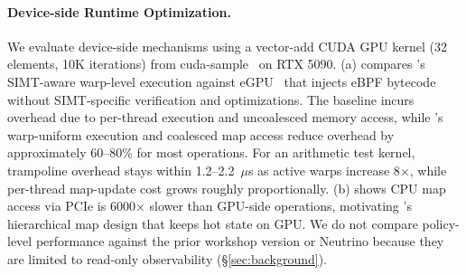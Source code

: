 \paragraph{Device-side Runtime Optimization.}
We evaluate device-side \sys mechanisms using a vector-add CUDA GPU kernel (32 elements, 10K iterations) from cuda-sample~\cite{nvidia_cuda_samples} on RTX 5090.
(a) compares \sys's SIMT-aware warp-level execution against eGPU~\cite{egpu} that injects eBPF bytecode without SIMT-specific verification and optimizations.
The baseline incurs overhead due to per-thread execution and uncoalesced memory access, while \sys's warp-uniform execution and coalesced map access reduce overhead by approximately 60--80\% for most operations.
For an arithmetic test kernel, trampoline overhead stays within 1.2--2.2~$\mu$s as active warps increase 8$\times$, while per-thread map-update cost grows roughly proportionally.
(b) shows CPU map access via PCIe is 6000$\times$ slower than GPU-side operations, motivating \sys's hierarchical map design that keeps hot state on GPU.
We do not compare policy-level performance against the prior workshop version or Neutrino because they are limited to read-only observability (\S\ref{sec:background}). %
